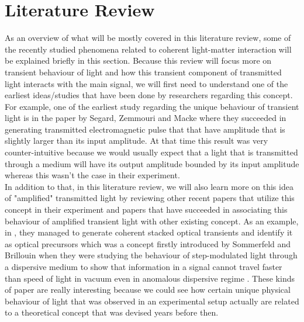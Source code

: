 \chapter{Literature Review}
As an overview of what will be mostly covered in this literature review, some of the recently studied phenomena related to coherent light-matter interaction will be explained briefly in this section. Because this review will focus more on transient behaviour of light and how this transient component of transmitted light interacts with the main signal, we will first need to understand one of the earliest ideas/studies that have been done by researchers regarding this concept. For example, one of the earliest study regarding the unique behaviour of transient light is in the paper by Segard, Zemmouri and Macke \cite{Segard_1987} where they succeeded in generating transmitted electromagnetic pulse that that have amplitude that is slightly larger than its input amplitude. At that time this result was very counter-intuitive because we would usually expect that a light that is transmitted through a medium will have its output amplitude bounded by its input amplitude whereas this wasn't the case in their experiment.\\

In addition to that, in this literature review, we will also learn more on this idea of "amplified" transmitted light by reviewing other recent papers that utilize this concept in their experiment and papers that have succeeded in associating this behaviour of amplified transient light with other existing concept. As an example, in \cite{jeong2010slow}, they managed to generate coherent stacked optical transients and identify it as optical precursors which was a concept firstly introduced by Sommerfeld and Brillouin when they were studying the behaviour of step-modulated light through a dispersive medium to show that information in a signal cannot travel faster than speed of light in vacuum even in anomalous dispersive regime \cite{brillouin1969wave}. These kinds of paper are really interesting because we could see how certain unique physical behaviour of light that was observed in an experimental setup actually are related to a theoretical concept that was devised years before then.\\


